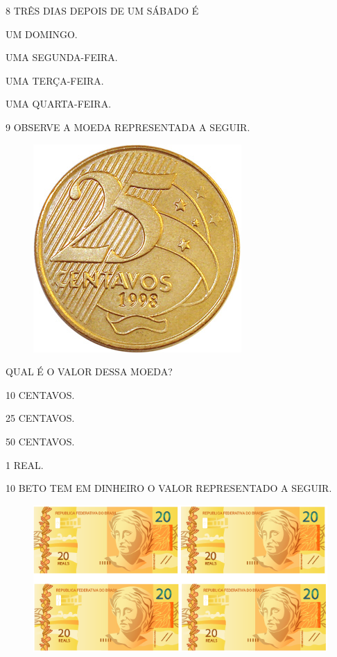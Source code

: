 \num{8} TRÊS DIAS DEPOIS DE UM SÁBADO É

\begin{escolha}[itemsep=0pt]
\item UM DOMINGO.

\item UMA SEGUNDA-FEIRA.

\item UMA TERÇA-FEIRA.

\item UMA QUARTA-FEIRA.
\end{escolha}

\num{9} OBSERVE A MOEDA REPRESENTADA A SEGUIR.

\begin{figure}[H]
\centering
\includegraphics[width=.2\textwidth]{./media/SAEB_1ANO_MAT_FIGURA132.png}
\end{figure}

QUAL É O VALOR DESSA MOEDA?

\begin{escolha}[itemsep=0pt]
\item 10 CENTAVOS.

\item 25 CENTAVOS.

\item 50 CENTAVOS.

\item 1 REAL.
\end{escolha}

\num{10} BETO TEM EM DINHEIRO O VALOR REPRESENTADO A SEGUIR.

\begin{figure}[H]
\centering
\includegraphics[width=\textwidth]{./media/SAEB_1ANO_MAT_FIGURA133b.png}
\end{figure}

